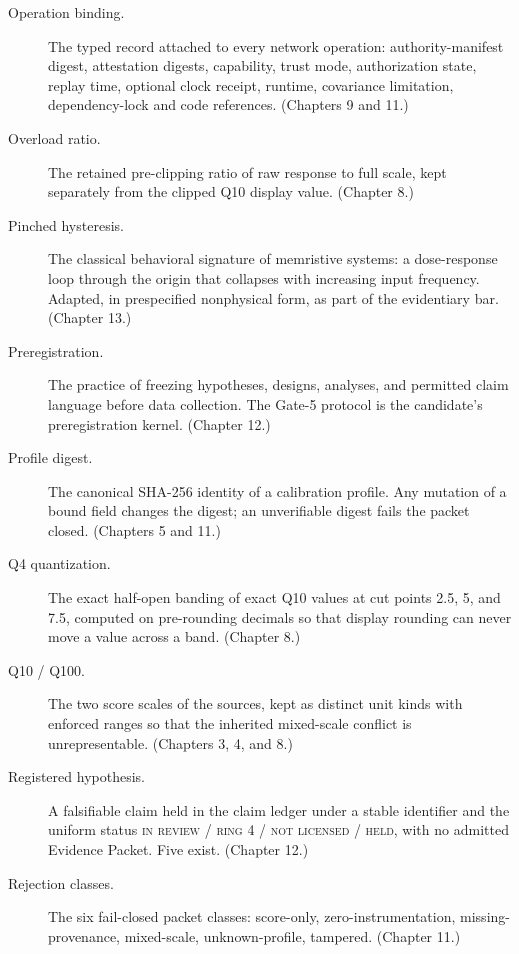 \begin{description}
\item[Operation binding.] The typed record attached to every network operation: authority-manifest digest, attestation digests, capability, trust mode, authorization state, replay time, optional clock receipt, runtime, covariance limitation, dependency-lock and code references. (Chapters 9 and 11.)

\item[Overload ratio.] The retained pre-clipping ratio of raw response to full scale, kept separately from the clipped Q10 display value. (Chapter 8.)

\item[Pinched hysteresis.] The classical behavioral signature of memristive systems: a dose-response loop through the origin that collapses with increasing input frequency. Adapted, in prespecified nonphysical form, as part of the evidentiary bar. (Chapter 13.)

\item[Preregistration.] The practice of freezing hypotheses, designs, analyses, and permitted claim language before data collection. The Gate-5 protocol is the candidate's preregistration kernel. (Chapter 12.)

\item[Profile digest.] The canonical SHA-256 identity of a calibration profile. Any mutation of a bound field changes the digest; an unverifiable digest fails the packet closed. (Chapters 5 and 11.)

\item[Q4 quantization.] The exact half-open banding of exact Q10 values at cut points 2.5, 5, and 7.5, computed on pre-rounding decimals so that display rounding can never move a value across a band. (Chapter 8.)

\item[Q10 / Q100.] The two score scales of the sources, kept as distinct unit kinds with enforced ranges so that the inherited mixed-scale conflict is unrepresentable. (Chapters 3, 4, and 8.)

\item[Registered hypothesis.] A falsifiable claim held in the claim ledger under a stable identifier and the uniform status \textsc{in review / ring 4 / not licensed / held}, with no admitted Evidence Packet. Five exist. (Chapter 12.)

\item[Rejection classes.] The six fail-closed packet classes: score-only, zero-instrumentation, missing-provenance, mixed-scale, unknown-profile, tampered. (Chapter 11.)


\end{description}
